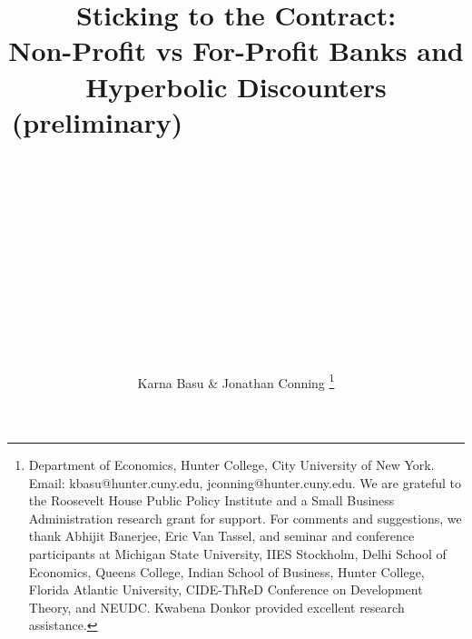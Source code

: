 \documentclass[11pt]{article}%
\providecommand{\DIFaddbegin}{} %
\providecommand{\DIFaddend}{} %
\providecommand{\DIFdelbegin}{} %
\providecommand{\DIFdelend}{} %
\begin{document}
\title{Sticking to the Contract: \\Non-Profit vs For-Profit Banks and Hyperbolic Discounters\\(preliminary)\ \ \ \ \ \ \ \ \ \ \ \ \ \ \ \ \ \ \ \ \ \ \ \ \ \ \ \ \ \ \ \ \ \ \ \ \ \ \ \ \ \ \ \ \ \ \ \ \ \ \ \ \ \ \ \ \ \ \ \ \ \ \ \ \ \ \ \ \ \ \ \ \ \ \ \ \ \ \ \ \ \ \ \ \ \ \ \ \ \ \ \ \ \ \ \ \ \ \ \ \ \ \ \ \ \ \ \ \ \ \ \ \ \ \ \ \ \ \ \ \ \ \ \ \ \ \ \ \ \ \ \ \ \ \ \ \ \ \ \ \ \ \ \ \ \ \ \ \ \ \ \ \ \ \ \ \ \ \ \ \ \ \ \ \ \ \ \ \ \ \ \ \ \ \ \ \ }
\author{Karna Basu \& Jonathan Conning\DIFdelbegin %
\DIFdelend \DIFaddbegin \thanks{Department of Economics, Hunter College,
City University of New York. Email: kbasu@hunter.cuny.edu,
jconning@hunter.cuny.edu. We are grateful to the Roosevelt House Public Policy
Institute and a Small Business Administration research grant for support. For
comments and suggestions, we thank Abhijit Banerjee, Eric Van Tassel, and
seminar and conference participants at Michigan State University, IIES
Stockholm, Delhi School of Economics, Queens College, Indian School of
Business, Hunter College, Florida Atlantic University, CIDE-ThReD Conference
on Development Theory, and NEUDC. Kwabena Donkor provided excellent research
assistance.}\DIFaddend }
\maketitle
\end{document}
